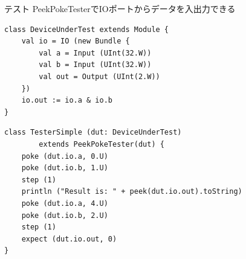 \begin{frame}[fragile]{テスト}
    PeekPokeTesterでIOポートからデータを入出力できる
    \begin{lstlisting}
class DeviceUnderTest extends Module {
    val io = IO (new Bundle {
        val a = Input (UInt(32.W))
        val b = Input (UInt(32.W))
        val out = Output (UInt(2.W))
    })
    io.out := io.a & io.b
}
    \end{lstlisting}
    
    \begin{lstlisting}
class TesterSimple (dut: DeviceUnderTest) 
        extends PeekPokeTester(dut) {
    poke (dut.io.a, 0.U)
    poke (dut.io.b, 1.U)
    step (1)
    println ("Result is: " + peek(dut.io.out).toString)
    poke (dut.io.a, 4.U)
    poke (dut.io.b, 2.U)
    step (1)
    expect (dut.io.out, 0)
}
    \end{lstlisting}

    
\end{frame}

